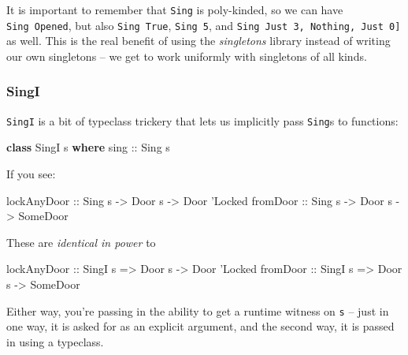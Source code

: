 \documentclass[]{article}
\newenvironment{Shaded}{}{}
\newcommand{\KeywordTok}[1]{\textcolor[rgb]{0.00,0.44,0.13}{\textbf{#1}}}
\newcommand{\DataTypeTok}[1]{\textcolor[rgb]{0.56,0.13,0.00}{#1}}
\newcommand{\CharTok}[1]{\textcolor[rgb]{0.25,0.44,0.63}{#1}}
\newcommand{\OtherTok}[1]{\textcolor[rgb]{0.00,0.44,0.13}{#1}}
\newcommand{\NormalTok}[1]{#1}
\begin{document}
It is important to remember that \texttt{Sing} is poly-kinded, so we can have
\texttt{Sing\ \textquotesingle{}Opened}, but also
\texttt{Sing\ \textquotesingle{}True}, \texttt{Sing\ 5}, and
\texttt{Sing\ \textquotesingle{}{[}\textquotesingle{}Just\ 3,\ \textquotesingle{}Nothing,\ \textquotesingle{}Just\ 0{]}}
as well. This is the real benefit of using the \emph{singletons} library instead
of writing our own singletons -- we get to work uniformly with singletons of all
kinds.

\subsubsection{SingI}\label{singi}

\texttt{SingI} is a bit of typeclass trickery that lets us implicitly pass
\texttt{Sing}s to functions:

\begin{Shaded}
\begin{Highlighting}[]
\KeywordTok{class} \DataTypeTok{SingI}\NormalTok{ s }\KeywordTok{where}
\OtherTok{    sing ::} \DataTypeTok{Sing}\NormalTok{ s}
\end{Highlighting}
\end{Shaded}

If you see:

\begin{Shaded}
\begin{Highlighting}[]
\OtherTok{lockAnyDoor ::} \DataTypeTok{Sing}\NormalTok{  s }\OtherTok{->} \DataTypeTok{Door}\NormalTok{ s }\OtherTok{->} \DataTypeTok{Door} \CharTok{'Locked}
\OtherTok{fromDoor    ::} \DataTypeTok{Sing}\NormalTok{  s }\OtherTok{->} \DataTypeTok{Door}\NormalTok{ s }\OtherTok{->} \DataTypeTok{SomeDoor}
\end{Highlighting}
\end{Shaded}

These are \emph{identical in power} to

\begin{Shaded}
\begin{Highlighting}[]
\OtherTok{lockAnyDoor ::} \DataTypeTok{SingI}\NormalTok{ s }\OtherTok{=>} \DataTypeTok{Door}\NormalTok{ s }\OtherTok{->} \DataTypeTok{Door} \CharTok{'Locked}
\OtherTok{fromDoor    ::} \DataTypeTok{SingI}\NormalTok{ s }\OtherTok{=>} \DataTypeTok{Door}\NormalTok{ s }\OtherTok{->} \DataTypeTok{SomeDoor}
\end{Highlighting}
\end{Shaded}

Either way, you're passing in the ability to get a runtime witness on \texttt{s}
-- just in one way, it is asked for as an explicit argument, and the second way,
it is passed in using a typeclass.
\end{document}
